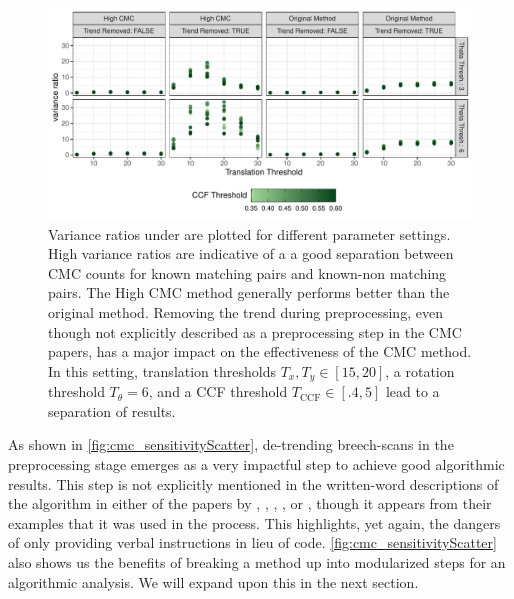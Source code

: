 \begin{Schunk}
\begin{figure}[htbp]

\includegraphics[width=\textwidth]{figures/cmcr-unnamed-chunk-20-1} \hfill{}

\caption{\label{fig:cmc_sensitivityScatter} Variance ratios under are plotted for different parameter settings. High variance ratios are indicative of a a good separation between CMC counts for known matching pairs and known-non matching pairs. The High CMC method generally performs better than the original method. Removing the trend during preprocessing, even though not explicitly described as a preprocessing step in the CMC papers, has a major impact on the effectiveness of the CMC method. In this setting, translation thresholds $T_x, T_y \in [15,20]$, a rotation threshold $T_\theta = 6$, and a CCF threshold $T_{\text{CCF}} \in [.4,5]$ lead to a separation of results. }\label{fig:unnamed-chunk-20}
\end{figure}
\end{Schunk}

As shown in \autoref{fig:cmc_sensitivityScatter}, de-trending
breech-scans in the preprocessing stage emerges as a very impactful step
to achieve good algorithmic results. This step is not explicitly
mentioned in the written-word descriptions of the algorithm in either of
the papers by \citet{song_proposed_2013}, \citet{tong_fired_2014},
\citet{tong_improved_2015}, \citet{chen_convergence_2017}, or
\citet{song_estimating_2018}, though it appears from their examples that
it was used in the process. This highlights, yet again, the dangers of
only providing verbal instructions in lieu of code.
\autoref{fig:cmc_sensitivityScatter} also shows us the benefits of
breaking a method up into modularized steps for an algorithmic analysis.
We will expand upon this in the next section.


